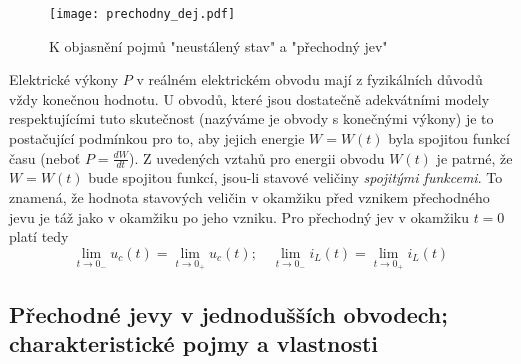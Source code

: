     \begin{figure}[ht!]
       \centering
       \texttt{[image: prechodny\_dej.pdf]}
       \caption[Přechodný jev]{K objasnění pojmů "neustálený stav" a "přechodný jev"}
       \label{TEO:fig_prechodny_dej}
    \end{figure}

    Elektrické výkony $P$ v reálném elektrickém obvodu mají z fyzikálních důvodů vždy konečnou 
    hodnotu. U obvodů, které jsou dostatečně adekvátními modely respektujícími tuto skutečnost 
    (nazýváme je obvody s konečnými výkony) je to postačující podmínkou pro to, aby jejich energie 
    $W = W(t)$ byla spojitou funkcí času (neboť $P = \frac{dW}{dt}$). Z uvedených vztahů pro 
    energii obvodu $W(t)$ je patrné, že $W = W(t)$ bude spojitou funkcí, jsou-li stavové veličiny 
    \emph{spojitými funkcemi}. To znamená, že hodnota stavových veličin v okamžiku před vznikem 
    přechodného jevu je táž jako v okamžiku po jeho vzniku. Pro přechodný jev v okamžiku $t=0$ 
    platí tedy
    \begin{equation}\label{TEO:eq_spojite_fce}
      \lim_{t\rightarrow0_-}u_c(t)= \lim_{t\rightarrow0_+}u_c(t); \quad  
      \lim_{t\rightarrow0_-}i_L(t)= \lim_{t\rightarrow0_+}i_L(t)
    \end{equation}

     \subsection{Přechodné jevy v jednodušších obvodech; charakteristické pojmy a vlastnosti}
            

            
  \newpage
